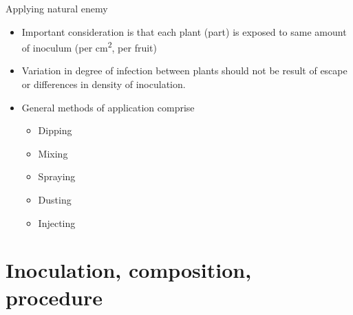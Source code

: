 \documentclass[11pt,dvipsnames,ignorenonframetext,aspectratio=169]{beamer}
\providecommand{\tightlist}{%
  \setlength{\itemsep}{0pt}\setlength{\parskip}{0pt}}
\begin{document}
\begin{frame}{Applying natural enemy}
\protect\hypertarget{applying-natural-enemy}{}
\begin{itemize}
\tightlist
\item
  Important consideration is that each plant (part) is exposed to same
  amount of inoculum (per \si{\square\centi\meter}, per fruit)
\item
  Variation in degree of infection between plants should not be result
  of escape or differences in density of inoculation.
\item
  General methods of application comprise

  \begin{itemize}
  \tightlist
  \item
    Dipping
  \item
    Mixing
  \item
    Spraying
  \item
    Dusting
  \item
    Injecting
  \end{itemize}
\end{itemize}
\end{frame}

\hypertarget{inoculation-composition-procedure}{%
\section{Inoculation, composition,
procedure}\label{inoculation-composition-procedure}}
\end{document}
